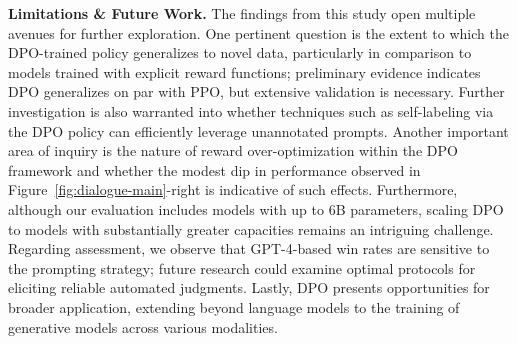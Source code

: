 \textbf{Limitations \& Future Work.} The findings from this study open multiple avenues for further exploration. One pertinent question is the extent to which the DPO-trained policy generalizes to novel data, particularly in comparison to models trained with explicit reward functions; preliminary evidence indicates DPO generalizes on par with PPO, but extensive validation is necessary. Further investigation is also warranted into whether techniques such as self-labeling via the DPO policy can efficiently leverage unannotated prompts. Another important area of inquiry is the nature of reward over-optimization within the DPO framework and whether the modest dip in performance observed in Figure~\ref{fig:dialogue-main}-right is indicative of such effects. Furthermore, although our evaluation includes models with up to 6B parameters, scaling DPO to models with substantially greater capacities remains an intriguing challenge. Regarding assessment, we observe that GPT-4-based win rates are sensitive to the prompting strategy; future research could examine optimal protocols for eliciting reliable automated judgments. Lastly, DPO presents opportunities for broader application, extending beyond language models to the training of generative models across various modalities.

